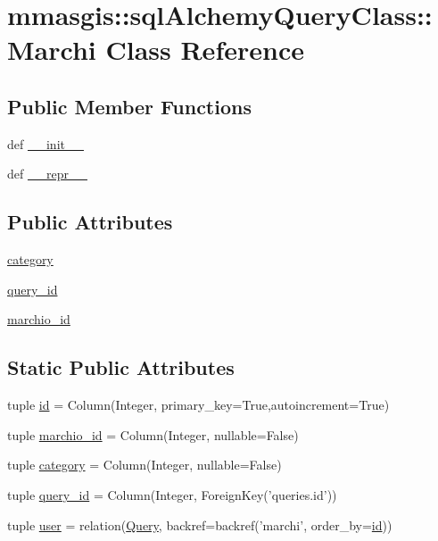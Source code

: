 \hypertarget{classmmasgis_1_1sqlAlchemyQueryClass_1_1Marchi}{
\section{mmasgis::sqlAlchemyQueryClass::Marchi Class Reference}
\label{classmmasgis_1_1sqlAlchemyQueryClass_1_1Marchi}
}
\subsection*{Public Member Functions}
\begin{DoxyCompactItemize}
\item 
def \hyperlink{classmmasgis_1_1sqlAlchemyQueryClass_1_1Marchi_a20cf3d9f438f05a9e24de5b926039639}{\_\-\_\-init\_\-\_\-}
\item 
def \hyperlink{classmmasgis_1_1sqlAlchemyQueryClass_1_1Marchi_a5edb18c319c51c33ca69684ed60e1869}{\_\-\_\-repr\_\-\_\-}
\end{DoxyCompactItemize}
\subsection*{Public Attributes}
\begin{DoxyCompactItemize}
\item 
\hyperlink{classmmasgis_1_1sqlAlchemyQueryClass_1_1Marchi_a0d3298e704e1408300791478db39b922}{category}
\item 
\hyperlink{classmmasgis_1_1sqlAlchemyQueryClass_1_1Marchi_a9b8d251712fec4b6a7316ae8a6e57cdf}{query\_\-id}
\item 
\hyperlink{classmmasgis_1_1sqlAlchemyQueryClass_1_1Marchi_ac87f896cc6c440e77b20ef927fa310a6}{marchio\_\-id}
\end{DoxyCompactItemize}
\subsection*{Static Public Attributes}
\begin{DoxyCompactItemize}
\item 
tuple \hyperlink{classmmasgis_1_1sqlAlchemyQueryClass_1_1Marchi_a1219279932278b7521c5bb94e5f8ccd5}{id} = Column(Integer, primary\_\-key=True,autoincrement=True)
\item 
tuple \hyperlink{classmmasgis_1_1sqlAlchemyQueryClass_1_1Marchi_a4a38d6d41bd48400494f91a23739dd68}{marchio\_\-id} = Column(Integer, nullable=False)
\item 
tuple \hyperlink{classmmasgis_1_1sqlAlchemyQueryClass_1_1Marchi_a9ce128f3578e1ba4c287a3e32037932e}{category} = Column(Integer, nullable=False)
\item 
tuple \hyperlink{classmmasgis_1_1sqlAlchemyQueryClass_1_1Marchi_a693b33009554c00197dc7ec1b9f90dfa}{query\_\-id} = Column(Integer, ForeignKey('queries.id'))
\item 
tuple \hyperlink{classmmasgis_1_1sqlAlchemyQueryClass_1_1Marchi_aa8687bdceacf9ed56e60c93baf5ed38f}{user} = relation(\hyperlink{classmmasgis_1_1sqlAlchemyQueryClass_1_1Query}{Query}, backref=backref('marchi', order\_\-by=\hyperlink{classmmasgis_1_1sqlAlchemyQueryClass_1_1Marchi_a1219279932278b7521c5bb94e5f8ccd5}{id}))
\end{DoxyCompactItemize}
